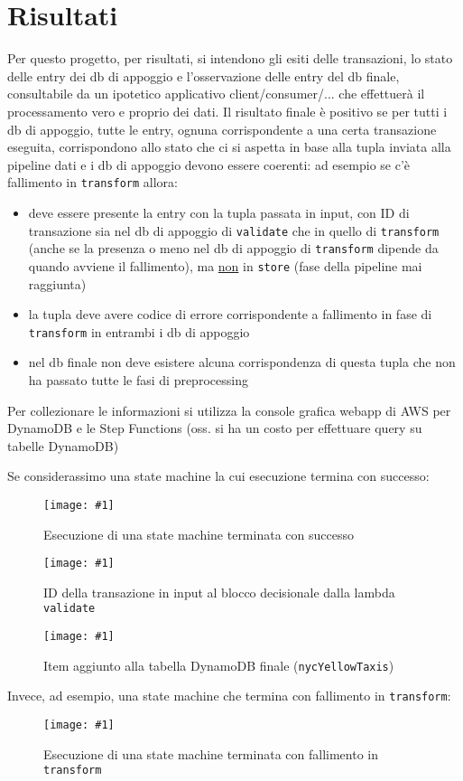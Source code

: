\documentclass[
    sigconf, 
    screen=false, 
    acmthm=false, 
    nonacm
]{acmart}
\def\maxpicwidth{8.15cm}
\newcommand{\pichere}[3] {
\begin{figure}[H]
\centering
\texttt{[image: \#1]}
\caption{#3}
\end{figure}
}
\begin{document}
\section{Risultati}
Per questo progetto, per risultati, si intendono gli esiti delle transazioni, lo stato delle entry dei db di 
appoggio e l'osservazione delle entry del db finale, consultabile da un ipotetico applicativo client/consumer/... 
che effettuerà il processamento vero e proprio dei dati.
Il risultato finale è positivo se per tutti i db di appoggio, tutte le entry, ognuna corrispondente a una certa 
transazione eseguita, corrispondono allo stato che ci si aspetta in base alla tupla inviata alla pipeline dati e i 
db di appoggio devono essere coerenti: ad esempio se c'è fallimento in \texttt{transform} allora:
\begin{itemize}
    \item deve essere presente la entry con la tupla passata in input, con ID di transazione sia nel db di appoggio 
    di \texttt{validate} che in quello di \texttt{transform} (anche se la presenza o meno nel db di appoggio di 
    \texttt{transform} dipende da quando avviene il fallimento), ma \underline{non} in \texttt{store} (fase della 
    pipeline mai raggiunta)
    \item la tupla deve avere codice di errore corrispondente a fallimento in fase di \texttt{transform} in 
    entrambi i db di appoggio
    \item nel db finale non deve esistere alcuna corrispondenza di questa tupla che non ha passato tutte le fasi
    di preprocessing
\end{itemize}
Per collezionare le informazioni si utilizza la console grafica webapp di AWS per DynamoDB e le Step Functions
(oss. si ha un costo per effettuare query su tabelle DynamoDB)

Se considerassimo una state machine la cui esecuzione termina con successo:

\pichere{case-ok/sfn}{5cm}{Esecuzione di una state machine terminata con successo}

\pichere{case-ok/transactionid}{4cm}{ID della transazione in input al blocco decisionale dalla lambda \texttt{validate}}

\pichere{case-ok/finaltableentry}{2cm}{Item aggiunto alla tabella DynamoDB finale (\texttt{nycYellowTaxis})}

Invece, ad esempio, una state machine che termina con fallimento in \texttt{transform}:

\pichere{case-transform/sfn}{5cm}{Esecuzione di una state machine terminata con fallimento in \texttt{transform}}
\end{document}
